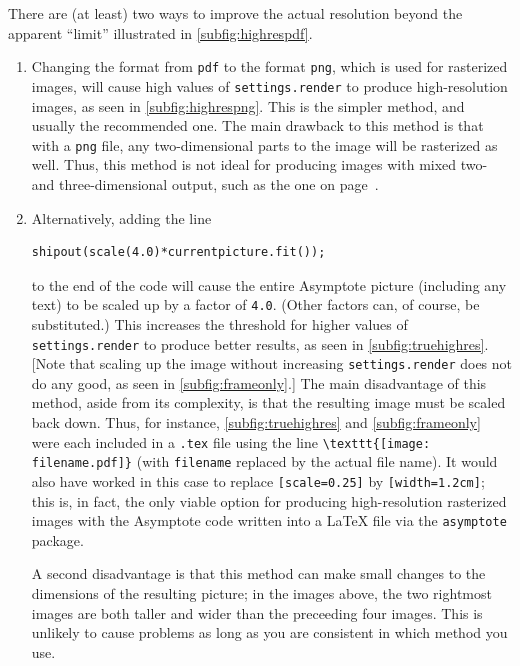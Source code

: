 \documentclass{article}
\begin{document}
\setlength{\emergencystretch}{1em}\par
\noindent There are (at least) two ways to improve the actual resolution beyond the 
apparent ``limit'' illustrated in \ref{subfig:highrespdf}.

\setlength{\emergencystretch}{0em}
\begin{enumerate}
\item Changing the format from \verb+pdf+ to the format \verb+png+, which is used for 
rasterized images, will cause high values of \lstinline!settings.render! to produce high-resolution 
images, as seen in \ref{subfig:highrespng}. This is the simpler method, and usually the recommended one. 
The main drawback to this method is that with a \verb+png+ file, any two-dimensional parts 
to the image
will be rasterized as well.  Thus, this method is not ideal for producing images with mixed two- and 
three-dimensional output, such as the one on 
page~\pageref{figure:target_diagram}.
\item Alternatively, adding the line 
\begin{lstlisting}
shipout(scale(4.0)*currentpicture.fit());
\end{lstlisting}
 to the 
end of the code will cause the entire Asymptote picture (including any text) to be scaled up by a 
factor of \lstinline!4.0!. (Other factors can, of course, be substituted.)  This increases the threshold 
for higher values of \lstinline!settings.render! to produce better results, as seen in 
\ref{subfig:truehighres}. [Note that scaling up the image without increasing \lstinline!settings.render! 
does not do any good, as seen in \ref{subfig:frameonly}.]  The main disadvantage of 
this method, aside from its complexity, is that the resulting image must be scaled back down.  Thus, 
for instance, \ref{subfig:truehighres} and \ref{subfig:frameonly} 
were each included in a \verb+.tex+ file using the 
line \verb+\texttt{[image: filename.pdf]}+ (with \lstinline!filename! replaced by 
the actual file name).  It would also have worked in this case to replace \lstinline![scale=0.25]! by 
\lstinline![width=1.2cm]!; this is, in fact, the only viable option for producing high-resolution 
rasterized images with the Asymptote code written into a \LaTeX{} file via the \verb+asymptote+ package.

A second disadvantage is that this method can make small changes to the dimensions of the 
resulting picture; in the images above, the two rightmost images are both taller and wider than 
the preceeding four images.  This is unlikely to cause problems as long as you are consistent in 
which method you use.
\end{enumerate}
\end{document}
